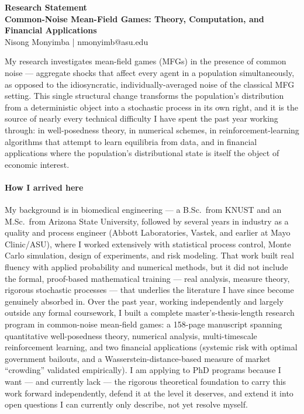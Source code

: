 \documentclass[11pt]{article}
\begin{document}
\begin{center}
{\Large\bfseries Research Statement}\\[4pt]
{\bfseries Common-Noise Mean-Field Games: Theory, Computation, and Financial Applications}\\[4pt]
Nisong Monyimba \;|\; nmonyimb@asu.edu
\end{center}
\vspace{8pt}

My research investigates mean-field games (MFGs) in the presence of common noise --- aggregate
shocks that affect every agent in a population simultaneously, as opposed to the idiosyncratic,
individually-averaged noise of the classical MFG setting. This single structural change transforms
the population's distribution from a deterministic object into a stochastic process in its own right,
and it is the source of nearly every technical difficulty I have spent the past year working through:
in well-posedness theory, in numerical schemes, in reinforcement-learning algorithms that attempt to
learn equilibria from data, and in financial applications where the population's distributional state
is itself the object of economic interest.

\paragraph{How I arrived here} My background is in biomedical engineering --- a B.Sc.\ from KNUST
and an M.Sc.\ from Arizona State University, followed by several years in industry as a quality and
process engineer (Abbott Laboratories, Vastek, and earlier at Mayo Clinic/ASU), where I worked
extensively with statistical process control, Monte Carlo simulation, design of experiments, and
risk modeling. That work built real fluency with applied probability and numerical methods, but it
did not include the formal, proof-based mathematical training --- real analysis, measure theory,
rigorous stochastic processes --- that underlies the literature I have since become genuinely
absorbed in. Over the past year, working independently and largely outside any formal coursework,
I built a complete master's-thesis-length research program in common-noise mean-field games: a
158-page manuscript spanning quantitative well-posedness theory, numerical analysis, multi-timescale
reinforcement learning, and two financial applications (systemic risk with optimal government
bailouts, and a Wasserstein-distance-based measure of market ``crowding'' validated empirically).
I am applying to PhD programs because I want --- and currently lack --- the rigorous theoretical
foundation to carry this work forward independently, defend it at the level it deserves, and extend
it into open questions I can currently only describe, not yet resolve myself.
\end{document}
